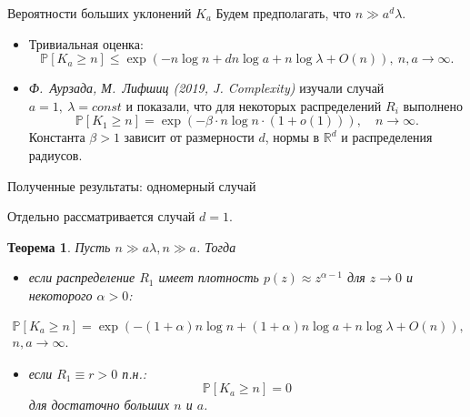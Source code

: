 \documentclass{beamer}
\theoremstyle{plain}
\newtheorem{thm}{Теорема} %
\theoremstyle{definition}
\theoremstyle{remark}
\def\geq{\geqslant}
\def\leq{\leqslant}
\newcommand{\R}{\mathbb{R}}
\newcommand{\PP}{\mathbb{P}}
\begin{document}
\begin{frame}{Вероятности больших уклонений $K_a$} 
Будем предполагать, что $n\gg a^d\lambda$.

\begin{itemize}
    \item Тривиальная оценка:
$$ \PP[K_a \geq n] \leq 
    \exp(-n\log n + dn\log a + n\log\lambda + 
    O(n)), \ n, a\to \infty.$$
    
    \item {\it Ф.~Аурзада, М.~Лифшиц (2019, J. Complexity)} изучали случай $a=1,\ \lambda = const$ и показали, что для некоторых распределений $R_i$ выполнено 
$$\PP[K_1 \geq n] = \exp(-\beta\cdot n\log n\cdot (1 + o(1))), \quad n\to\infty.$$
Константа $\beta > 1$ зависит от размерности $d$, нормы в $\R^d$ и распределения радиусов.
\end{itemize}

\end{frame}

\begin{frame}{Полученные результаты: одномерный случай}

Отдельно рассматривается случай $d=1$.
\begin{thm}
Пусть $n\gg a\lambda, n\gg a$. Тогда
\begin{itemize}
    \item если распределение $R_1$ имеет плотность $p(z)\approx z^{\alpha-1}$ для $z\to 0$ и некоторого $\alpha > 0$:
\end{itemize}
    \begin{multline*}
    \PP[K_a\geq n] = \exp(-(1+\alpha)n\log n + (1+\alpha)n\log a
    +n\log\lambda +O(n)), \\n,a \to\infty.
\end{multline*}\begin{itemize}
\item если $R_1\equiv r>0$ п.н.:
\begin{equation*}
    \PP[K_a\geq n] = 0
\end{equation*}
для достаточно больших  $n$ и $a$.
\end{itemize}
\end{thm}
    
\end{frame}
\end{document}
